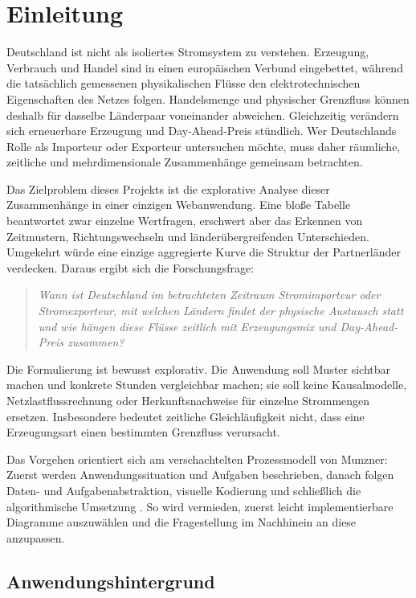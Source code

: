 \section{Einleitung}
\label{sec:einleitung}

Deutschland ist nicht als isoliertes Stromsystem zu verstehen. Erzeugung,
Verbrauch und Handel sind in einen europäischen Verbund eingebettet, während
die tatsächlich gemessenen physikalischen Flüsse den elektrotechnischen
Eigenschaften des Netzes folgen. Handelsmenge und physischer Grenzfluss können
deshalb für dasselbe Länderpaar voneinander abweichen. Gleichzeitig verändern
sich erneuerbare Erzeugung und Day-Ahead-Preis stündlich. Wer Deutschlands Rolle
als Importeur oder Exporteur untersuchen möchte, muss daher räumliche,
zeitliche und mehrdimensionale Zusammenhänge gemeinsam betrachten.

Das Zielproblem dieses Projekts ist die explorative Analyse dieser
Zusammenhänge in einer einzigen Webanwendung. Eine blo{\ss}e Tabelle beantwortet
zwar einzelne Wertfragen, erschwert aber das Erkennen von Zeitmustern,
Richtungswechseln und länderübergreifenden Unterschieden. Umgekehrt würde eine
einzige aggregierte Kurve die Struktur der Partnerländer verdecken. Daraus
ergibt sich die Forschungsfrage:

\begin{quote}
\itshape
Wann ist Deutschland im betrachteten Zeitraum Stromimporteur oder
Stromexporteur, mit welchen Ländern findet der physische Austausch statt und
wie hängen diese Flüsse zeitlich mit Erzeugungsmix und Day-Ahead-Preis zusammen?
\end{quote}

Die Formulierung ist bewusst explorativ. Die Anwendung soll Muster sichtbar
machen und konkrete Stunden vergleichbar machen; sie soll keine Kausalmodelle,
Netzlastflussrechnung oder Herkunftsnachweise für einzelne Strommengen
ersetzen. Insbesondere bedeutet zeitliche Gleichläufigkeit nicht, dass eine
Erzeugungsart einen bestimmten Grenzfluss verursacht.

Das Vorgehen orientiert sich am verschachtelten Prozessmodell von Munzner:
Zuerst werden Anwendungssituation und Aufgaben beschrieben, danach folgen
Daten- und Aufgabenabstraktion, visuelle Kodierung und schlie{\ss}lich die
algorithmische Umsetzung \cite{munzner2009nested}. So wird vermieden, zuerst
leicht implementierbare Diagramme auszuwählen und die Fragestellung im
Nachhinein an diese anzupassen.

\subsection{Anwendungshintergrund}
\label{sec:hintergrund}

